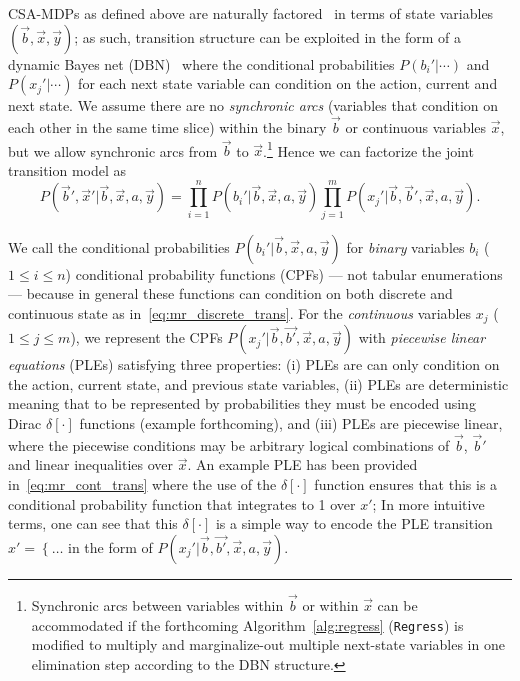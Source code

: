 CSA-MDPs as defined above are naturally factored~\cite{boutilier99dt}
in terms of state variables $(\vec{b},\vec{x},\vec{y})$; as such,
transition structure can be exploited in the form of a dynamic Bayes
net (DBN)~\cite{dbn} where the conditional probabilities
$P(b_i'|\cdots)$ and $P(x_j'|\cdots)$ for each next state variable can
condition on the action, current and next state.  We assume
there are no \emph{synchronic arcs} (variables that condition on each
other in the same time slice) within the binary $\vec{b}$ or
continuous variables $\vec{x}$, but we allow synchronic arcs from
$\vec{b}$ to $\vec{x}$.\footnote{Synchronic arcs between variables
within $\vec{b}$ or within $\vec{x}$ can be accommodated if the
forthcoming Algorithm~\ref{alg:regress} (\texttt{Regress}) is modified
to multiply and marginalize-out multiple next-state variables in one
elimination step according to the DBN structure.}  Hence we can factorize 
the joint transition model as
{\footnotesize
\begin{equation}
P(\vec{b}',\vec{x}'|\vec{b},\vec{x},a,\vec{y}) = 
\prod_{i=1}^n P(b_i'|\vec{b},\vec{x},a,\vec{y}) \prod_{j=1}^m P(x_j'|\vec{b},\vec{b}',\vec{x},a,\vec{y}). \nonumber %
\end{equation}}

We call the conditional probabilities
$P(b_i'|\vec{b},\vec{x},a,\vec{y})$ for \emph{binary} variables $b_i$
($1 \leq i \leq n$) conditional probability functions (CPFs) --- not
tabular enumerations --- because in general these functions can
condition on both discrete and continuous state as
in~\eqref{eq:mr_discrete_trans}.  For the \emph{continuous} variables
$x_j$ ($1 \leq j \leq m$), we represent the CPFs
$P(x_j'|\vec{b},\vec{b'},\vec{x},a,\vec{y})$ with \emph{piecewise
linear equations} (PLEs) satisfying three properties: (i) PLEs are
can only condition on the
action, current state, and previous state variables, (ii) PLEs are
deterministic meaning that to be represented by probabilities they
must be encoded using Dirac $\delta[\cdot]$ functions (example
forthcoming), and (iii) PLEs are piecewise linear, where the piecewise
conditions may be arbitrary logical combinations of $\vec{b}$, $\vec{b}'$ 
and linear inequalities over $\vec{x}$.  An example PLE has been
provided in~\eqref{eq:mr_cont_trans} where the use of the 
$\delta[\cdot]$ function ensures that this is a conditional
probability function that integrates to 1 over $x'$; In more intuitive
terms, one can see that this $\delta[\cdot]$ is a simple way to encode
the PLE transition $x' = \left\{ \ldots \right.$ in the form of 
$P(x_j'|\vec{b},\vec{b'},\vec{x},a,\vec{y})$.

